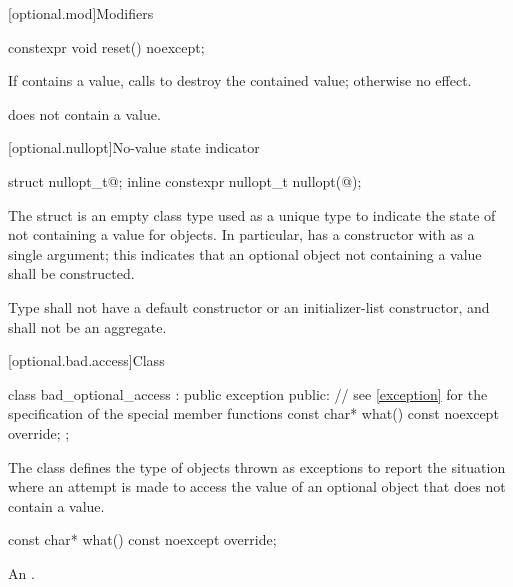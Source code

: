 [optional.mod]{Modifiers}

%
\begin{itemdecl}
constexpr void reset() noexcept;
\end{itemdecl}

\begin{itemdescr}
\pnum
\effects
If  contains a value, calls  to destroy the contained value;
otherwise no effect.

\pnum
\ensures
{} does not contain a value.
\end{itemdescr}

[optional.nullopt]{No-value state indicator}

%
%
\begin{itemdecl}
struct nullopt_t{@\seebelow@};
inline constexpr nullopt_t nullopt(@\unspec@);
\end{itemdecl}

\pnum
The struct  is an empty class type used as a unique type to indicate the state of not containing a value for  objects.
In particular,  has a constructor with  as a single argument;
this indicates that an optional object not containing a value shall be constructed.

\pnum
Type  shall not have a default constructor or an initializer-list constructor, and shall not be an aggregate.

[optional.bad.access]{Class }

\begin{codeblock}
class bad_optional_access : public exception {
public:
  // see \ref{exception} for the specification of the special member functions
  const char* what() const noexcept override;
};
\end{codeblock}

\pnum
The class  defines the type of objects thrown as exceptions to report the situation where an attempt is made to access the value of an optional object that does not contain a value.

%
\begin{itemdecl}
const char* what() const noexcept override;
\end{itemdecl}

\begin{itemdescr}
\pnum
\returns
An  \ntbs{}.
\end{itemdescr}

